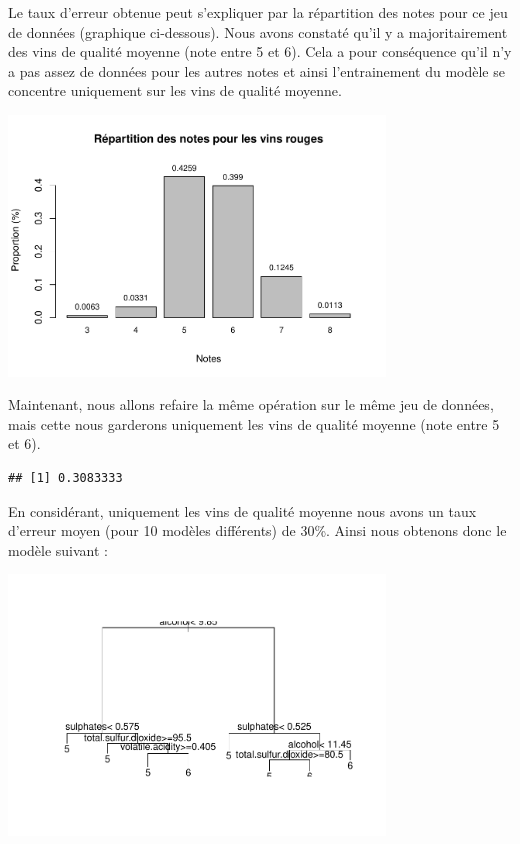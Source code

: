 \documentclass[
]{article}
\begin{document}
Le taux d'erreur obtenue peut s'expliquer par la répartition des notes
pour ce jeu de données (graphique ci-dessous). Nous avons constaté qu'il
y a majoritairement des vins de qualité moyenne (note entre 5 et 6).
Cela a pour conséquence qu'il n'y a pas assez de données pour les autres
notes et ainsi l'entrainement du modèle se concentre uniquement sur les
vins de qualité moyenne.

\begin{center}
	\includegraphics[width=10cm]{repport_files/figure-latex/unnamed-chunk-23-1.pdf}
\end{center}
Maintenant, nous allons refaire la même opération sur le même jeu de
données, mais cette nous garderons uniquement les vins de qualité
moyenne (note entre 5 et 6).

\begin{verbatim}
## [1] 0.3083333
\end{verbatim}

En considérant, uniquement les vins de qualité moyenne nous avons un
taux d'erreur moyen (pour 10 modèles différents) de 30\%. Ainsi nous
obtenons donc le modèle suivant :

\begin{center}
	\includegraphics[width=10cm]{repport_files/figure-latex/unnamed-chunk-25-1.pdf}
\end{center}
\end{document}
